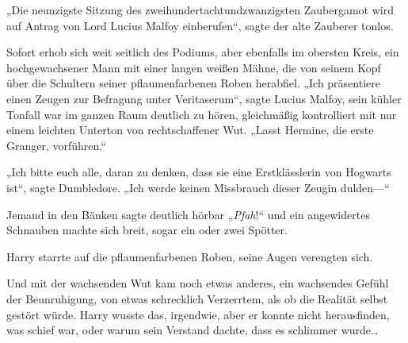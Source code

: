 „Die neunzigste Sitzung des zweihundertachtundzwanzigsten Zaubergamot wird auf Antrag von Lord Lucius Malfoy einberufen“, sagte der alte Zauberer tonlos.

Sofort erhob sich weit seitlich des Podiums, aber ebenfalls im obersten Kreis, ein hochgewachsener Mann mit einer langen weißen Mähne, die von seinem Kopf über die Schultern seiner pflaumenfarbenen Roben herabfiel.
„Ich präsentiere einen Zeugen zur Befragung unter Veritaserum“, sagte Lucius Malfoy, sein kühler Tonfall war im ganzen Raum deutlich zu hören, gleichmäßig kontrolliert mit nur einem leichten Unterton von rechtschaffener Wut. „Lasst Hermine, die erste Granger, vorführen.“

„Ich bitte euch alle, daran zu denken, dass sie eine Erstklässlerin von Hogwarts ist“, sagte Dumbledore. „Ich werde keinen Missbrauch dieser Zeugin dulden—“

Jemand in den Bänken sagte deutlich hörbar „\emph{Pfah}!“ und ein angewidertes Schnauben machte sich breit, sogar ein oder zwei Spötter.

Harry starrte auf die pflaumenfarbenen Roben, seine Augen verengten sich.

Und mit der wachsenden Wut kam noch etwas anderes, ein wachsendes Gefühl der Beunruhigung, von etwas schrecklich Verzerrtem, als ob die Realität selbst gestört würde. Harry wusste das, irgendwie, aber er konnte nicht herausfinden, was schief war, oder warum sein Verstand dachte, dass es schlimmer wurde…

